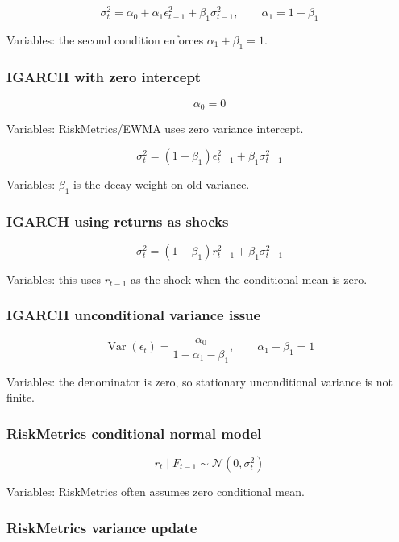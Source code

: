 \documentclass[
  8pt,
  twocolumn]{extarticle}
\begin{document}
\[
\sigma_t^2=\alpha_0+\alpha_1\epsilon_{t-1}^2+\beta_1\sigma_{t-1}^2,\qquad \alpha_1=1-\beta_1
\]

Variables: the second condition enforces \(\alpha_1+\beta_1=1\).

\subsubsection{IGARCH with zero
intercept}\label{igarch-with-zero-intercept}

\[
\alpha_0=0
\]

Variables: RiskMetrics/EWMA uses zero variance intercept.

\[
\sigma_t^2=(1-\beta_1)\epsilon_{t-1}^2+\beta_1\sigma_{t-1}^2
\]

Variables: \(\beta_1\) is the decay weight on old variance.

\subsubsection{IGARCH using returns as
shocks}\label{igarch-using-returns-as-shocks}

\[
\sigma_t^2=(1-\beta_1)r_{t-1}^2+\beta_1\sigma_{t-1}^2
\]

Variables: this uses \(r_{t-1}\) as the shock when the conditional mean
is zero.

\subsubsection{IGARCH unconditional variance
issue}\label{igarch-unconditional-variance-issue}

\[
\operatorname{Var}(\epsilon_t)=\frac{\alpha_0}{1-\alpha_1-\beta_1},\qquad \alpha_1+\beta_1=1
\]

Variables: the denominator is zero, so stationary unconditional variance
is not finite.

\subsubsection{RiskMetrics conditional normal
model}\label{riskmetrics-conditional-normal-model}

\[
r_t\mid F_{t-1}\sim\mathcal N(0,\sigma_t^2)
\]

Variables: RiskMetrics often assumes zero conditional mean.

\subsubsection{RiskMetrics variance
update}\label{riskmetrics-variance-update}
\end{document}
